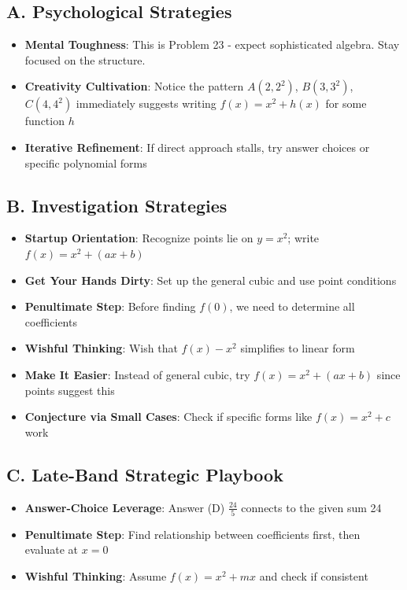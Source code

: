 \documentclass[]{article}
\begin{document}
\begin{strategicbox}
\subsection*{A. Psychological Strategies}
\begin{itemize}[leftmargin=*]
    \item \textbf{Mental Toughness}: This is Problem 23 - expect sophisticated algebra. Stay focused on the structure.
    \item \textbf{Creativity Cultivation}: Notice the pattern $A(2, 2^2)$, $B(3, 3^2)$, $C(4, 4^2)$ immediately suggests writing $f(x) = x^2 + h(x)$ for some function $h$
    \item \textbf{Iterative Refinement}: If direct approach stalls, try answer choices or specific polynomial forms
\end{itemize}

\subsection*{B. Investigation Strategies}
\begin{itemize}[leftmargin=*]
    \item \textbf{Startup Orientation}: Recognize points lie on $y = x^2$; write $f(x) = x^2 + (ax + b)$
    \item \textbf{Get Your Hands Dirty}: Set up the general cubic and use point conditions
    \item \textbf{Penultimate Step}: Before finding $f(0)$, we need to determine all coefficients
    \item \textbf{Wishful Thinking}: Wish that $f(x) - x^2$ simplifies to linear form
    \item \textbf{Make It Easier}: Instead of general cubic, try $f(x) = x^2 + (ax + b)$ since points suggest this
    \item \textbf{Conjecture via Small Cases}: Check if specific forms like $f(x) = x^2 + c$ work
\end{itemize}

\subsection*{C. Late-Band Strategic Playbook}
\begin{itemize}[leftmargin=*]
    \item \textbf{Answer-Choice Leverage}: Answer (D) $\frac{24}{5}$ connects to the given sum 24
    \item \textbf{Penultimate Step}: Find relationship between coefficients first, then evaluate at $x=0$
    \item \textbf{Wishful Thinking}: Assume $f(x) = x^2 + mx$ and check if consistent
\end{itemize}


\end{strategicbox}
\end{document}
